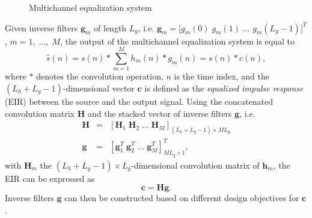 \documentclass{article}
\begin{document}
\begin{figure}[b]
  \caption{Multichannel equalization system}
  \label{fig: acsys}
\end{figure}
Given inverse filters $\mathbf{g}_m$ of length $L_g$, i.e. $\mathbf{g}_m = [g_m(0) \; g_m(1) \; \ldots$ $ g_m(L_g-1)]^T$, $m = 1, \; \ldots, \; M$,
the output of the multichannel equalization system is equal to
\begin{equation}  
  \hat{s}(n) = s(n) \ast \sum_{m=1}^{M} h_m(n) \ast g_m(n) = s(n) \ast c(n),
\end{equation}
where $\ast$ denotes the convolution operation, $n$ is the time index, and the  $(L_h+L_g-1)$-dimensional vector $\mathbf{c}$ is defined as the \emph{equalized impulse response} (EIR) between the source and the output signal.
Using the concatenated convolution matrix $\mathbf{H}$ and the stacked vector of inverse filters $\mathbf{g}$, i.e.
\begin{eqnarray}
  \mathbf{H}  &=&  \left[\mathbf{H}_1 \; \mathbf{H}_2 \; \ldots \; \mathbf{H}_M \right]_{(L_h+L_g-1)\times ML_g} \\
  \mathbf{g}  &=& \left[\mathbf{g}_1^T \; \mathbf{g}_2^T \; \ldots \; \mathbf{g}_M^T \right]_{ML_g \times 1}^T,
\end{eqnarray}
with $\mathbf{H}_m$ the $(L_h+L_g-1)\times L_g$-dimensional convolution matrix of $\mathbf{h}_m$, the EIR can be expressed as
\begin{equation}
\label{eq: c}
\mathbf{c} = \mathbf{H} \mathbf{g}.
\end{equation}
Inverse filters $\mathbf{g}$ can then be constructed based on different design objectives for $\mathbf{c}$.
\end{document}
